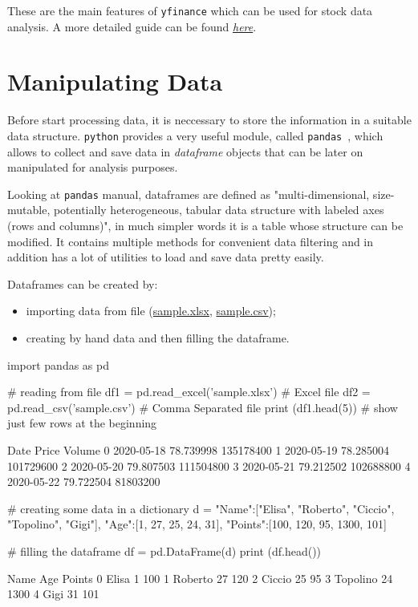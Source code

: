 These are the main features of \texttt{yfinance} which can be used for stock data analysis. A more detailed guide can be found \href{https://algotrading101.com/learn/yfinance-guide/}{\emph{here}}.

\section{Manipulating Data}
Before start processing data, it is neccessary to store the information in a suitable data structure. \texttt{python} provides a very useful module, called \texttt{pandas}~\cite{pandas}, which allows to collect and save data in \emph{dataframe} objects that can be later on manipulated for analysis purposes.

Looking at \texttt{pandas} manual, dataframes are defined as "multi-dimensional, size-mutable, potentially heterogeneous, tabular data structure with labeled axes (rows and columns)", in much simpler words it is a table whose structure can be modified.
It contains multiple methods for convenient data filtering and in addition has a lot of utilities to load and save data pretty easily.

Dataframes can be created by:
\begin{itemize}
\tightlist
\item importing data from file (\href{https://github.com/matteosan1/finance_course/raw/master/input_files/sample.xlsx}{sample.xlsx}, \href{https://raw.githubusercontent.com/matteosan1/finance_course/master/input_files/sample.csv}{sample.csv});
\item creating by hand data and then filling the dataframe.
\end{itemize}

\begin{ipythonnon}
import pandas as pd

# reading from file
df1 = pd.read_excel('sample.xlsx') # Excel file
df2 = pd.read_csv('sample.csv') # Comma Separated file
print (df1.head(5)) # show just few rows at the beginning
\end{ipythonnon}
\begin{ioutput}
         Date      Price     Volume
0  2020-05-18  78.739998  135178400
1  2020-05-19  78.285004  101729600
2  2020-05-20  79.807503  111504800
3  2020-05-21  79.212502  102688800
4  2020-05-22  79.722504   81803200
\end{ioutput}

\begin{ipythonnon}
# creating some data in a dictionary
d = {"Name":["Elisa", "Roberto", "Ciccio", "Topolino", "Gigi"],
	 "Age":[1, 27, 25, 24, 31],
	 "Points":[100, 120, 95, 1300, 101]}

# filling the dataframe
df = pd.DataFrame(d)
print (df.head())
\end{ipythonnon}
\begin{ioutput}
       Name  Age     Points
0     Elisa    1        100
1   Roberto   27        120
2    Ciccio   25         95
3  Topolino   24       1300
4      Gigi   31        101
\end{ioutput}


